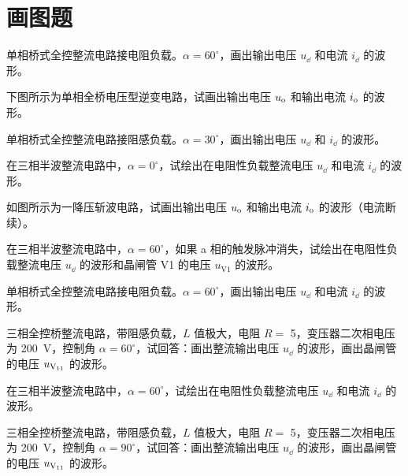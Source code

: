 \documentclass[电力电子]{subfiles}
\begin{document}
\section{画图题}
\begin{ti}[10 分]
	单相桥式全控整流电路接电阻负载。$\alpha = 60^\circ$，画出输出电压 $u_{\dd}$ 和电流 $i_{\dd}$ 的波形。
\end{ti}

\begin{ti}[10 分]
	下图所示为单相全桥电压型逆变电路，试画出输出电压 $u_{\mathrm{o}}$ 和输出电流 $i_{\mathrm{o}}$ 的波形。
\end{ti}

\begin{ti}[10 分]
	单相桥式全控整流电路接阻感负载。$\alpha = 30^\circ$，画出输出电压 $u_{\dd}$ 和 $i_{\dd}$ 的波形。
\end{ti}

\begin{ti}[10 分]
	在三相半波整流电路中，$\alpha = 0^\circ$，试绘出在电阻性负载整流电压 $u_{\dd}$ 和电流 $i_{\dd}$ 的波形。
\end{ti}

\begin{ti}[10 分]
	如图所示为一降压斩波电路，试画出输出电压 $u_{\mathrm{o}}$ 和输出电流 $i_{\mathrm{o}}$ 的波形（电流断续）。
\end{ti}

\begin{ti}[10 分]
	在三相半波整流电路中，$\alpha = 60^\circ$，如果 a 相的触发脉冲消失，试绘出在电阻性负载整流电压 $u_{\dd}$ 的波形和晶闸管 V1 的电压 $u_{\text{V1}}$ 的波形。
\end{ti}

\begin{ti}[10 分]
	单相桥式全控整流电路接电阻负载。$\alpha = 60^\circ$，画出输出电压 $u_{\dd}$ 和电流 $i_{\dd}$ 的波形。
\end{ti}

\begin{ti}[10 分]
	三相全控桥整流电路，带阻感负载，$L$ 值极大，电阻 $R =$ \SI{5}{\Omega}，变压器二次相电压为 \SI{200}{V}，控制角 $\alpha = 60^\circ$，试回答：画出整流输出电压 $u_{\dd}$ 的波形，画出晶闸管 \V 的电压 $u_{\text{V\textsubscript{11}}}$ 的波形。
\end{ti}

\begin{ti}[10 分]
	在三相半波整流电路中，$\alpha = 60^\circ$，试绘出在电阻性负载整流电压 $u_{\dd}$ 和电流 $i_{\dd}$ 的波形。
\end{ti}

\begin{ti}[10 分]
	三相全控桥整流电路，带阻感负载，$L$ 值极大，电阻 $R =$ \SI{5}{\Omega}，变压器二次相电压为 \SI{200}{V}，控制角 $\alpha = 90^\circ$，试回答：画出整流输出电压 $u_{\dd}$ 的波形，画出晶闸管 \V 的电压 $u_{\text{V\textsubscript{11}}}$ 的波形。
\end{ti}
\end{document}

